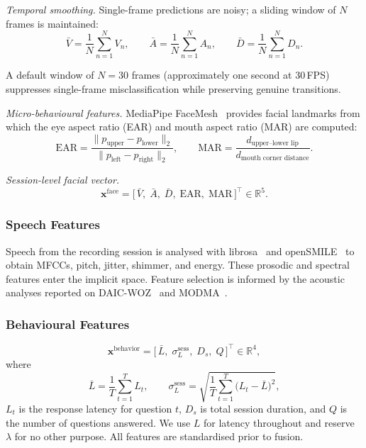 \documentclass[12pt]{article}
\begin{document}
\emph{Temporal smoothing.} Single-frame predictions are noisy; a sliding
window of $N$ frames is maintained:
\begin{equation}
\bar{V} = \frac{1}{N}\sum_{n=1}^{N}V_n, \qquad
\bar{A} = \frac{1}{N}\sum_{n=1}^{N}A_n, \qquad
\bar{D} = \frac{1}{N}\sum_{n=1}^{N}D_n .
\end{equation}

\noindent A default window of $N=30$ frames (approximately one second at
30\,FPS) suppresses single-frame misclassification while preserving
genuine transitions.

\emph{Micro-behavioural features.} MediaPipe
FaceMesh~\cite{lugaresi2019mediapipe} provides facial landmarks from
which the eye aspect ratio (EAR) and mouth aspect ratio (MAR) are
computed:
\begin{equation}
\text{EAR} = \frac{\lVert p_{\text{upper}} - p_{\text{lower}}\rVert_{2}}
                 {\lVert p_{\text{left}} - p_{\text{right}}\rVert_{2}},
\qquad
\text{MAR} = \frac{d_{\text{upper--lower lip}}}
                  {d_{\text{mouth corner distance}}} .
\end{equation}

\emph{Session-level facial vector.}
\begin{equation}
\mathbf{x}^{\text{face}} = \bigl[\,\bar{V},\; \bar{A},\; \bar{D},\;
\text{EAR},\; \text{MAR}\,\bigr]^{\top} \in \mathbb{R}^{5}.
\end{equation}

\subsubsection{Speech Features}

Speech from the recording session is analysed with
librosa~\cite{mcfee2015librosa} and
openSMILE~\cite{eyben2010opensmile} to obtain MFCCs, pitch, jitter,
shimmer, and energy. These prosodic and spectral features enter the
implicit space. Feature selection is informed by the acoustic analyses
reported on DAIC-WOZ~\cite{gratch2014daic,alhanai2018daic} and
MODMA~\cite{liu2022modma}.

\subsubsection{Behavioural Features}

\begin{equation}
\mathbf{x}^{\text{behavior}}
= \bigl[\,\bar{L},\; \sigma^{\text{sess}}_{L},\; D_{s},\; Q\,\bigr]^{\top}
\in \mathbb{R}^{4},
\end{equation}
where
\begin{equation}
\bar{L} = \frac{1}{T}\sum_{t=1}^{T}L_t,
\qquad
\sigma^{\text{sess}}_{L}
= \sqrt{\frac{1}{T}\sum_{t=1}^{T}\bigl(L_t - \bar{L}\bigr)^{2}} ,
\end{equation}
$L_t$ is the response latency for question $t$,
$D_{s}$ is total session duration, and $Q$ is the number of questions
answered. We use $L$ for latency throughout and reserve $\lambda$ for
no other purpose. All features are standardised prior to fusion.
\end{document}
